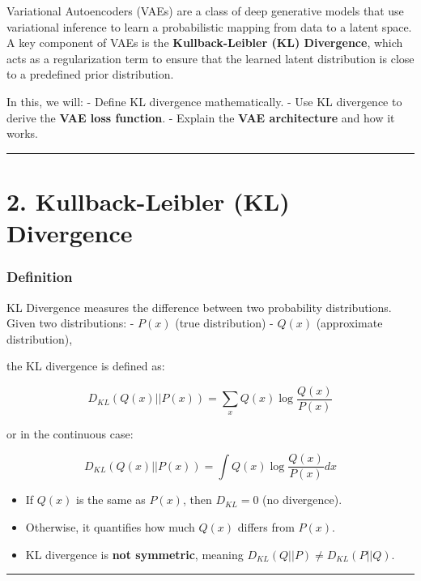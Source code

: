 \documentclass[
]{book}
\providecommand{\tightlist}{%
  \setlength{\itemsep}{0pt}\setlength{\parskip}{0pt}}
\begin{document}
Variational Autoencoders (VAEs) are a class of deep generative models that use variational inference to learn a probabilistic mapping from data to a latent space. A key component of VAEs is the \textbf{Kullback-Leibler (KL) Divergence}, which acts as a regularization term to ensure that the learned latent distribution is close to a predefined prior distribution.

In this, we will:
- Define KL divergence mathematically.
- Use KL divergence to derive the \textbf{VAE loss function}.
- Explain the \textbf{VAE architecture} and how it works.

\begin{center}\rule{0.5\linewidth}{0.5pt}\end{center}

\chapter{2. Kullback-Leibler (KL) Divergence}\label{kullback-leibler-kl-divergence}

\subsection{\texorpdfstring{\textbf{Definition}}{Definition}}\label{definition}

KL Divergence measures the difference between two probability distributions. Given two distributions:
- \(P(x)\) (true distribution)
- \(Q(x)\) (approximate distribution),

the KL divergence is defined as:

\[
D_{KL}( Q(x) || P(x) ) = \sum_x Q(x) \log \frac{Q(x)}{P(x)}
\]

or in the continuous case:

\[
D_{KL}( Q(x) || P(x) ) = \int Q(x) \log \frac{Q(x)}{P(x)} dx
\]

\begin{itemize}
\tightlist
\item
  If \(Q(x)\) is the same as \(P(x)\), then \(D_{KL} = 0\) (no divergence).
\item
  Otherwise, it quantifies how much \(Q(x)\) differs from \(P(x)\).
\item
  KL divergence is \textbf{not symmetric}, meaning \(D_{KL}(Q||P) \neq D_{KL}(P||Q)\).
\end{itemize}

\begin{center}\rule{0.5\linewidth}{0.5pt}\end{center}
\end{document}
